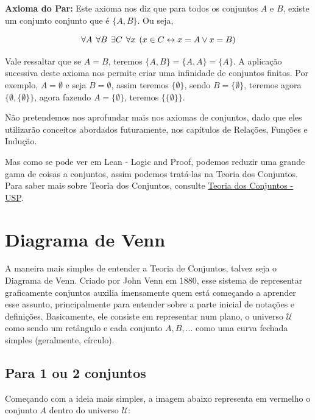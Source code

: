 \textbf{Axioma do Par:} Este axioma nos diz que para todos os conjuntos $A$ e $B$, existe um conjunto conjunto que é $\{A,B\}$. Ou seja,

\[\forall A \hspace{1.5mm} \forall B \hspace{1.5mm} \exists C \hspace{1.5mm} \forall x \hspace{1.5mm} (x \in C \leftrightarrow x = A \vee x = B)\]

Vale ressaltar que se $A=B$, teremos $\{A,B\}=\{A,A\}=\{A\}$. A aplicação sucessiva deste axioma nos permite criar uma infinidade de conjuntos finitos. Por exemplo, $A=\emptyset$ e seja $B=\emptyset$, assim teremos $\{\emptyset\}$, sendo $B=\{\emptyset\}$, teremos agora $\{\emptyset,\{\emptyset\}\}$, agora fazendo $A=\{\emptyset\}$, teremos $\{\{\emptyset\}\}$.

Não pretendemos nos aprofundar mais nos axiomas de conjuntos, dado que eles utilizarão conceitos abordados futuramente, nos capítulos de Relações, Funções e Indução.

Mas como se pode ver em Lean - Logic and Proof, podemos reduzir uma grande gama de coisas a conjuntos, assim podemos tratá-las na Teoria dos Conjuntos. Para saber mais sobre Teoria dos Conjuntos, consulte \href{https://www.ime.usp.br/~fajardo/Conjuntos.pdf}{Teoria dos Conjuntos - USP}.

\section{Diagrama de Venn}
A maneira mais simples de entender a Teoria de Conjuntos, talvez seja o Diagrama de Venn. Criado por John Venn em 1880, esse sistema de representar graficamente conjuntos auxilia imensamente quem está começando a aprender esse assunto, principalmente para entender sobre a parte inicial de notações e definições. Basicamente, ele consiste em representar num plano, o universo $\mathcal U$ como sendo um retângulo e cada conjunto $A,B,...$ como uma curva fechada simples (geralmente, círculo).

\subsection{Para 1 ou 2 conjuntos}
Começando com a ideia mais simples, a imagem abaixo representa em vermelho o conjunto $A$ dentro do universo $\mathcal U$:

